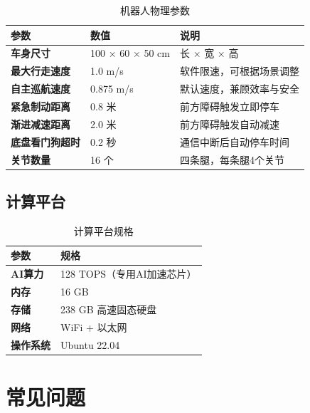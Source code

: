\documentclass[a4paper, 12pt, openany]{book}
\begin{document}
\begin{table}[!htb]
\centering
\renewcommand{\arraystretch}{1.4}
\begin{tabularx}{\textwidth}{>{\bfseries}l l X}
  \toprule
  参数 & 数值 & 说明 \\
  \midrule
  车身尺寸 & 100 × 60 × 50 cm & 长 × 宽 × 高 \\
  最大行走速度 & 1.0 m/s & 软件限速，可根据场景调整 \\
  自主巡航速度 & 0.875 m/s & 默认速度，兼顾效率与安全 \\
  紧急制动距离 & 0.8 米 & 前方障碍触发立即停车 \\
  渐进减速距离 & 2.0 米 & 前方障碍触发自动减速 \\
  底盘看门狗超时 & 0.2 秒 & 通信中断后自动停车时间 \\
  关节数量 & 16 个 & 四条腿，每条腿4个关节 \\
  \bottomrule
\end{tabularx}
\caption{机器人物理参数}
\end{table}

\section{计算平台}

\begin{table}[!htb]
\centering
\renewcommand{\arraystretch}{1.4}
\begin{tabularx}{\textwidth}{>{\bfseries}l X}
  \toprule
  参数 & 规格 \\
  \midrule
  AI算力 & 128 TOPS（专用AI加速芯片） \\
  内存 & 16 GB \\
  存储 & 238 GB 高速固态硬盘 \\
  网络 & WiFi + 以太网 \\
  操作系统 & Ubuntu 22.04 \\
  \bottomrule
\end{tabularx}
\caption{计算平台规格}
\end{table}


\chapter{常见问题}
\end{document}
